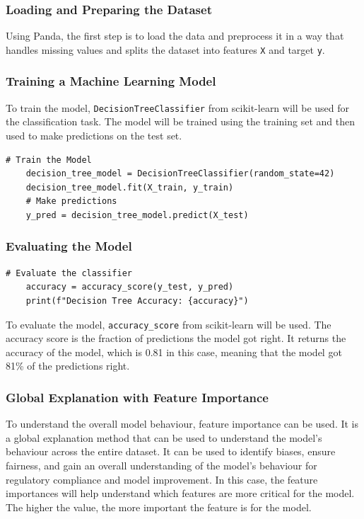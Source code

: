 \documentclass[10pt,journal,compsoc]{IEEEtran}
\begin{document}
\subsubsection{Loading and Preparing the Dataset}
Using Panda, the first step is to load the data and preprocess it in a way that handles missing values and splits the dataset into features \texttt{X} and target \texttt{y}.

\subsubsection{Training a Machine Learning Model}
To train the model, \texttt{DecisionTreeClassifier} from scikit-learn will be used for the classification task. The model will be trained using the training set and then used to make predictions on the test set.

\begin{lstlisting}[caption=Training a Decision Tree Classifier]
    # Train the Model
    decision_tree_model = DecisionTreeClassifier(random_state=42)
    decision_tree_model.fit(X_train, y_train)
    # Make predictions
    y_pred = decision_tree_model.predict(X_test)
\end{lstlisting}

\subsubsection{Evaluating the Model}

\begin{lstlisting}[caption=Evaluating the Model]
    # Evaluate the classifier
    accuracy = accuracy_score(y_test, y_pred)
    print(f"Decision Tree Accuracy: {accuracy}")
\end{lstlisting}

To evaluate the model, \texttt{accuracy\_score} from scikit-learn will be used. The accuracy score is the fraction of predictions the model got right.
It returns the accuracy of the model, which is 0.81 in this case, meaning that the model got 81\% of the predictions right.

\subsubsection{Global Explanation with Feature Importance}

To understand the overall model behaviour, feature importance can be used. It is a global explanation method that can be used to understand the model's behaviour across the entire dataset. It can be used to identify biases, ensure fairness, and gain an overall understanding of the model's behaviour for regulatory compliance and model improvement. \cite{phillips2020four}
In this case, the feature importances will help understand which features are more critical for the model. The higher the value, the more important the feature is for the model.
\end{document}
